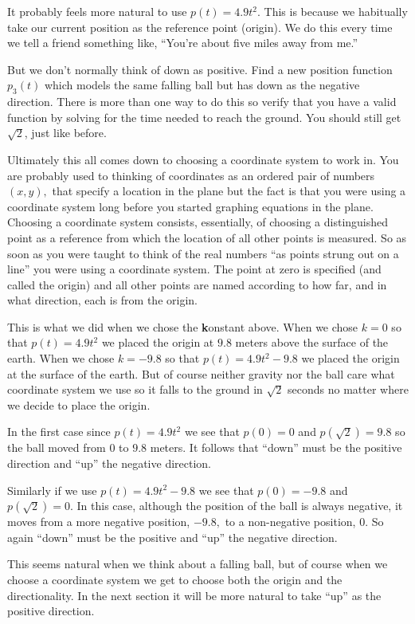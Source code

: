 \begin{Digression}
\begin{ProficiencyDrill}{}
  It probably feels more natural to use $p(t)=4.9t^2.$ This is because
  we habitually take our current position as the reference point
  (origin). We do this every time we tell a friend something like,
  ``You're about five miles away from me.''

  But we don't normally think of down as positive. Find a new position
  function $p_3(t)$ which models the same falling ball but has down as
  the negative direction. There is more than one way to do this so
  verify that you have a valid function by solving for the time needed
  to reach the ground. You should still get $\sqrt{2}$, just like
  before.
\end{ProficiencyDrill}

Ultimately this all comes down to choosing a coordinate system to work
in. You are probably used to thinking of coordinates as an ordered
pair of numbers $(x,y),$ that specify a location in the plane but the
fact is that you were using a coordinate system long before you
started graphing equations in the plane.  Choosing a coordinate system
consists, essentially, of choosing a distinguished point as a
reference from which the location of all other points is measured. So
as soon as you were taught to think of the real numbers ``as points
strung out on a line'' you were using a coordinate system. The point
at zero is specified (and called the origin) and all other points are
named according to how far, and in what direction, each is from the
origin.

This is what we did when we chose the {\bf k}onstant above. When we
chose $k=0$ so that $p(t)=4.9t^2$ we placed the origin at $9.8$ meters
above the surface of the earth. When we chose $k=-9.8$ so that
$p(t)=4.9t^2-9.8$ we placed the origin at the surface of the
earth. But of course neither gravity nor the ball care what coordinate
system we use so it falls to the ground in $\sqrt{2}$ seconds no
matter where we decide to place the origin.

In the first case since $p(t)=4.9t^2$ we see that $p(0) = 0$ and
$p(\sqrt{2}) = 9.8$ so the ball moved from $0$ to $9.8$ meters. It
follows that ``down'' must be the positive direction and ``up'' the
negative direction.

Similarly if we use $p(t)=4.9t^2-9.8$ we see that $p(0) = -9.8$ and
$p(\sqrt{2}) = 0.$ In this case, although the position of the ball is
always negative, it moves from a more negative position, $-9.8,$ to a
non-negative position, $0.$ So again ``down'' must be the positive and
``up'' the negative direction.

This seems natural when we think about a falling ball, but of course
when we choose a coordinate system we get to choose both the origin
and the directionality. In the next section it will be more natural to
take ``up'' as the positive direction.
\end{Digression}


